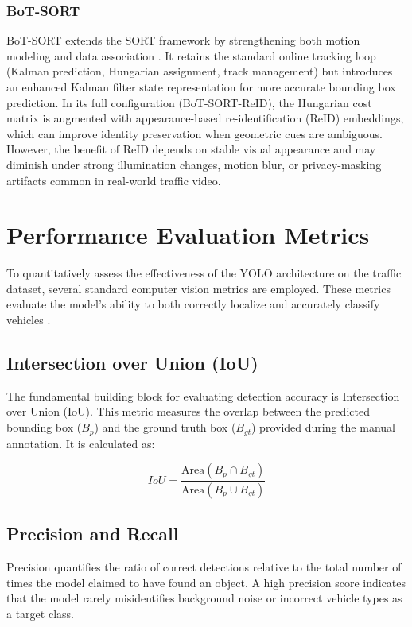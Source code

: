 \subsubsection*{BoT-SORT}

BoT-SORT extends the SORT framework by strengthening both motion modeling 
and data association \citep{Aharon2022BoTSORT}. It retains the standard 
online tracking loop (Kalman prediction, Hungarian assignment, track 
management) but introduces an enhanced Kalman filter state representation 
for more accurate bounding box prediction. In its full configuration 
(BoT-SORT-ReID), the Hungarian cost matrix is augmented with 
appearance-based re-identification (ReID) embeddings, which can improve 
identity preservation when geometric cues are ambiguous. However, the 
benefit of ReID depends on stable visual appearance and may diminish under 
strong illumination changes, motion blur, or privacy-masking artifacts 
common in real-world traffic video.

\section{Performance Evaluation Metrics}
\label{sec:evaluation_metrics}
To quantitatively assess the effectiveness of the YOLO architecture on the traffic dataset, several standard computer vision metrics are employed. These metrics evaluate the model's ability to both correctly localize and accurately classify vehicles \citep{vijayakumar2024yolo}.

\subsection*{Intersection over Union (IoU)}
The fundamental building block for evaluating detection accuracy is Intersection over Union (IoU). This metric measures the overlap between the predicted bounding box (\(B_p\)) and the ground truth box (\(B_{gt}\)) provided during the manual annotation. It is calculated as:

\begin{equation}
IoU = \frac{\text{Area}(B_p \cap B_{gt})}{\text{Area}(B_p \cup B_{gt})}
\end{equation}

\subsection*{Precision and Recall}
Precision quantifies the ratio of correct detections relative to the total number of times the model claimed to have found an object. A high precision score indicates that the model rarely misidentifies background noise or incorrect vehicle types as a target class.

